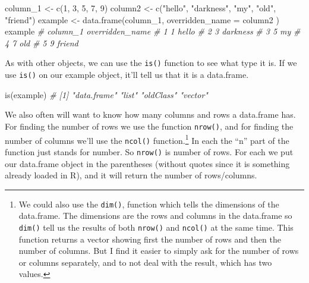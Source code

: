 \documentclass[
  a4paper,
]{krantz}
\makeatletter
\newenvironment{Shaded}{\begin{snugshade}}{\end{snugshade}}
\newcommand{\AttributeTok}[1]{\textcolor[rgb]{0.77,0.63,0.00}{#1}}
\newcommand{\CommentTok}[1]{\textcolor[rgb]{0.56,0.35,0.01}{\textit{#1}}}
\newcommand{\DecValTok}[1]{\textcolor[rgb]{0.00,0.00,0.81}{#1}}
\newcommand{\FunctionTok}[1]{\textcolor[rgb]{0.00,0.00,0.00}{#1}}
\newcommand{\NormalTok}[1]{#1}
\newcommand{\OtherTok}[1]{\textcolor[rgb]{0.56,0.35,0.01}{#1}}
\newcommand{\StringTok}[1]{\textcolor[rgb]{0.31,0.60,0.02}{#1}}
\newenvironment{kframe}{%
\medskip{}
\setlength{\fboxsep}{.8em}
 \def\at@end@of@kframe{}%
 \ifinner\ifhmode%
  \def\at@end@of@kframe{\end{minipage}}%
  \begin{minipage}{\columnwidth}%
 \fi\fi%
 \def\FrameCommand##1{\hskip\@totalleftmargin \hskip-\fboxsep
 \colorbox{shadecolor}{##1}\hskip-\fboxsep
     \hskip-\linewidth \hskip-\@totalleftmargin \hskip\columnwidth}%
 \MakeFramed {\advance\hsize-\width
   \@totalleftmargin\z@ \linewidth\hsize
   \@setminipage}}%
 {\par\unskip\endMakeFramed%
 \at@end@of@kframe}
\renewenvironment{Shaded}{\begin{kframe}}{\end{kframe}}
\makeatother
\begin{document}
\begin{Shaded}
\begin{Highlighting}[]
\NormalTok{column\_1 }\OtherTok{\textless{}{-}} \FunctionTok{c}\NormalTok{(}\DecValTok{1}\NormalTok{, }\DecValTok{3}\NormalTok{, }\DecValTok{5}\NormalTok{, }\DecValTok{7}\NormalTok{, }\DecValTok{9}\NormalTok{)}
\NormalTok{column2 }\OtherTok{\textless{}{-}} \FunctionTok{c}\NormalTok{(}\StringTok{"hello"}\NormalTok{, }\StringTok{"darkness"}\NormalTok{, }\StringTok{"my"}\NormalTok{, }\StringTok{"old"}\NormalTok{, }\StringTok{"friend"}\NormalTok{)}
\NormalTok{example }\OtherTok{\textless{}{-}} \FunctionTok{data.frame}\NormalTok{(column\_1,}
  \AttributeTok{overridden\_name =}\NormalTok{ column2}
\NormalTok{)}
\NormalTok{example}
\CommentTok{\#   column\_1 overridden\_name}
\CommentTok{\# 1        1           hello}
\CommentTok{\# 2        3        darkness}
\CommentTok{\# 3        5              my}
\CommentTok{\# 4        7             old}
\CommentTok{\# 5        9          friend}
\end{Highlighting}
\end{Shaded}

As with other objects, we can use the \texttt{is()} function
to see what type it is. If we use \texttt{is()} on our
example object, it'll tell us that it is a data.frame.

\begin{Shaded}
\begin{Highlighting}[]
\FunctionTok{is}\NormalTok{(example)}
\CommentTok{\# [1] "data.frame" "list"       "oldClass"   "vector"}
\end{Highlighting}
\end{Shaded}

We also often will want to know how many columns and rows a
data.frame has. For finding the number of rows we use the
function \texttt{nrow()}, and for finding the number of
columns we'll use the \texttt{ncol()} function.\footnote{We
  could also use the \texttt{dim()}, function which tells
  the dimensions of the data.frame. The dimensions are the
  rows and columns in the data.frame so \texttt{dim()} tell
  us the results of both \texttt{nrow()} and \texttt{ncol()}
  at the same time. This function returns a vector showing
  first the number of rows and then the number of columns.
  But I find it easier to simply ask for the number of rows
  or columns separately, and to not deal with the result,
  which has two values.} In each the ``n'' part of the
function just stands for number. So \texttt{nrow()} is
number of rows. For each we put our data.frame object in the
parentheses (without quotes since it is something already
loaded in R), and it will return the number of rows/columns.
\end{document}
